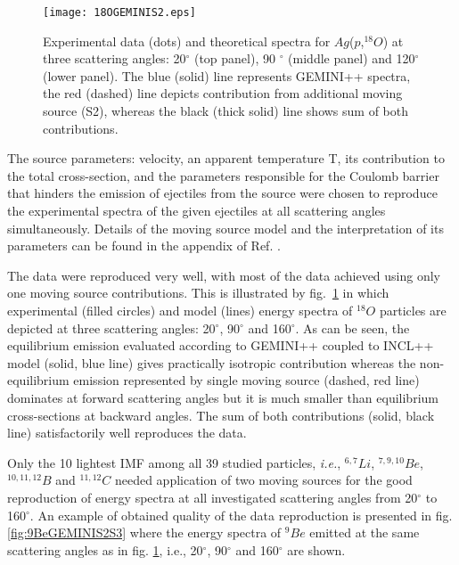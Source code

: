 \begin{figure}[!h]
	\centering
		\texttt{[image: 18OGEMINIS2.eps]}
	\caption{Experimental data (dots) and theoretical spectra for $Ag$($p$,$^{18}O$) at three
		scattering angles: 20$^{\circ}$ (top panel), 90 $^{\circ}$ (middle panel) and 120$^{\circ}$ (lower panel).
		The blue (solid) line represents GEMINI++ spectra, the red (dashed) line depicts contribution
		from additional moving source (S2), whereas the black (thick solid) line shows sum of both contributions.}
	\label{fig:18OGEMINIS2}
\end{figure}
%

The source parameters: velocity, an apparent temperature T, its contribution to the total cross-section, and the parameters responsible for the Coulomb barrier that hinders the emission of ejectiles from the source were chosen to reproduce the experimental spectra of the given ejectiles at all scattering angles simultaneously. Details of the moving source model and the interpretation of its parameters can be found in the appendix of Ref. \cite{bubak2007non}.

The data were reproduced very well, with most of the data achieved 
using only one moving source contributions. This is illustrated by fig.~\ref{fig:18OGEMINIS2} in which experimental (filled circles) and model (lines) energy spectra of $^{18}O$ particles are depicted at three scattering angles: 20$^{\circ}$, 90$^{\circ}$ and 160$^{\circ}$.
%
As can be seen, the equilibrium
emission evaluated according to GEMINI++ \cite{CHARITY1988,Charity2010} coupled to
INCL++ \cite{INCLMancusi2014} model (solid, blue line) gives practically
isotropic contribution whereas the non-equilib\-rium emission
represented by single moving source (dashed, red line) dominates at
forward scattering angles but it is much smaller than equilibrium
cross-sections at backward angles. The sum of both contributions
(solid, black line) satisfactorily well reproduces the data.

Only the 10 lightest IMF among all 39 studied particles, \emph{i.e.},
$^{6,7}Li$, $^{7,9,10}Be$, $^{10,11,12}B$ and $^{11,12}C$ needed
application of two moving sources for the good reproduction of
energy spectra at all investigated scattering angles from
20$^{\circ}$ to 160$^{\circ}$.  An example of obtained quality of
the data reproduction is presented in fig.  \ref{fig:9BeGEMINIS2S3}
where the energy spectra of $^9Be$ emitted at the same scattering
angles as in fig. \ref{fig:18OGEMINIS2}, i.e.,  20$^{\circ}$, 90$^{\circ}$ and 160$^{\circ}$ are shown.  

